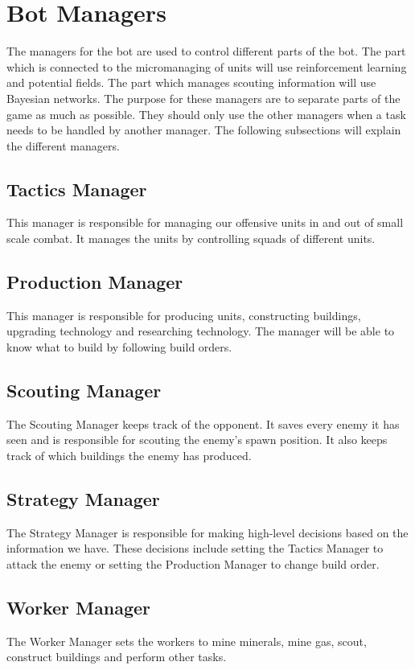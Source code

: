 \section{Bot Managers}
	\label{design::managers}
	The managers for the bot are used to control different parts of the bot. The part which is connected to the micromanaging of units will use 
	reinforcement learning and potential fields. The part which manages scouting information will use Bayesian networks. 
	The purpose for these managers are to separate parts of the game as much as possible. They should only use the other managers when a task needs to be handled 
	by another manager. The following subsections will explain the different managers.
	
	\subsection*{Tactics Manager}
		This manager is responsible for managing our offensive units in and out of small scale combat. 
		It manages the units by controlling squads of different units.
	\subsection*{Production Manager}
		This manager is responsible for producing units, constructing buildings, upgrading technology and researching technology. The manager will be able to 
		know what to build by following build orders.
	\subsection*{Scouting Manager}
		The Scouting Manager keeps track of the opponent. 
		It saves every enemy it has seen and is responsible for scouting the enemy's spawn position. 
		It also keeps track of which buildings the enemy has produced.
	\subsection*{Strategy Manager}
		The Strategy Manager is responsible for making high-level decisions based on the information we have. These decisions include
		setting the Tactics Manager to attack the enemy or setting the Production Manager to change build order.
	\subsection*{Worker Manager}
		The Worker Manager sets the workers to mine minerals, mine gas, scout, construct buildings and perform other tasks.
